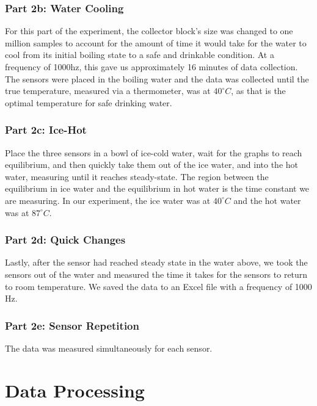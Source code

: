 \documentclass{article}
\begin{document}
\subsubsection{Part 2b: Water Cooling} %

For this part of the experiment, the collector block's size was changed to one million samples to account for the amount of time it would take for the water to cool from its initial boiling state to a safe and drinkable condition.  At a frequency of 1000hz, this gave us approximately 16 minutes of data collection.  The sensors were placed in the boiling water and the data was collected until the true temperature, measured via a thermometer, was at \(40^\circ C\), as that is the optimal temperature for safe drinking water.  

\subsubsection{Part 2c: Ice-Hot} %

Place the three sensors in a bowl of ice-cold water, wait for the graphs to reach equilibrium, and then quickly take them out of the ice water, and into the hot water, measuring until it reaches steady-state.  The region between the equilibrium in ice water and the equilibrium in hot water is the time constant we are measuring.  In our experiment, the ice water was at \(40^\circ C\) and the hot water was at \(87^\circ C\).  

\subsubsection{Part 2d: Quick Changes} %

Lastly, after the sensor had reached steady state in the water above, we took the sensors out of the water and measured the time it takes for the sensors to return to room temperature. We saved the data to an Excel file with a frequency of 1000 Hz. 

\subsubsection{Part 2e: Sensor Repetition} %

The data was measured simultaneously for each sensor.  

\section{Data Processing}
\end{document}
